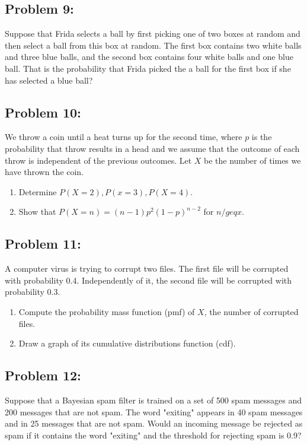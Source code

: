 \documentclass[12pt,en,a4paper]{article}
\begin{document}
	\subsection*{Problem 9:}
	Suppose that Frida selects a ball by first picking one of two boxes at random and then select a ball from this box at random. The first box contains two white balls and three blue balls, and the second box contains four white balls and one blue ball. That is the probability that Frida picked the a ball for the first box if she has selected a blue ball?
	
	\subsection*{Problem 10:}
	We throw a coin until a heat turns up for the second time, where $p$ is the probability that throw results in a head and we assume that the outcome of each throw is independent of the previous outcomes. Let $X$ be the number of times we have thrown the coin.
	\begin{enumerate}
		\item Determine $P(X = 2), P(x = 3), P(X = 4)$.
		\item Show that $P(X = n) = (n-1) p^2 (1-p)^{n - 2}$ for $n /geq x$.
	\end{enumerate}
	
	\subsection*{Problem 11:}
	A computer virus is trying to corrupt two files. The first file will be corrupted with probability 0.4. Independently of it, the second file will be corrupted with probability 0.3.
	\begin{enumerate}
		\item Compute the probability mass function (pmf) of $X$, the number of corrupted files.
		\item Draw a graph of its cumulative distributions function (cdf).
	\end{enumerate}
	
	\subsection*{Problem 12:}
	Suppose that a Bayesian spam filter is trained on a set of 500 spam messages and 200 messages that are not spam. The word "exiting" appears in 40 spam messages and in 25 messages that are not spam. Would an incoming message be rejected as spam if it contains the word "exiting" and the threshold for rejecting spam is 0.9?
	
\end{document}
